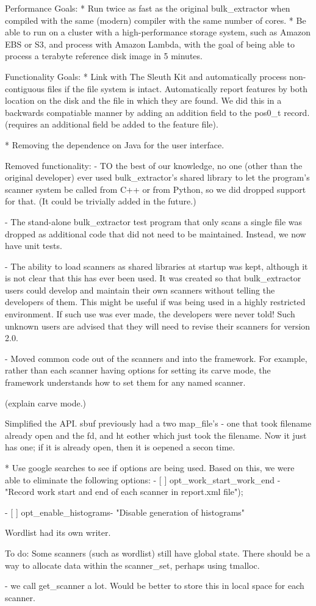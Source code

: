 Performance Goals:
* Run twice as fast as the original bulk_extractor when compiled with
the same (modern) compiler with the same number of cores.
* Be able to run on a cluster with a high-performance storage system,
such as Amazon EBS or S3, and process with Amazon Lambda, with the
goal of being able to process a terabyte reference disk image in 5
minutes.

Functionality Goals:
* Link with The Sleuth Kit and automatically process non-contiguous
files if the file system is intact. Automatically report features by
both location on the disk and the file in which they are found. We did
this in a backwards compatiable manner by adding an addition field to
the pos0_t record.
(requires an additional field be added to the feature file).

* Removing the dependence on Java for the user interface.



Removed functionality:
- TO the best of our knowledge, no one (other than the original
developer) ever used bulk_extractor's shared library to let the
program's scanner system be called from C++ or from Python, so we did
dropped support for that. (It could be trivially added in the future.)

- The stand-alone bulk_extractor test program that only scans a single
file was dropped as additional code that did not need to be
maintained. Instead, we now have unit tests.

- The ability to load scanners as shared libraries at startup was
kept, although it is not clear that this has ever been used. It was
created so that bulk_extractor users could develop and maintain their
own scanners without telling the developers of them. This might be
useful if \be was being used in a highly restricted environment. If
such use was ever made, the developers were never told! Such unknown
users are advised that they will need to revise their scanners for
version 2.0.


- Moved common code out of the scanners and into the framework. For
example, rather than each scanner having options for setting its carve
mode, the framework understands how to set them for any named
scanner.

(explain carve mode.)

Simplified the API. sbuf previously had a two map_file's - one that
took filename already open and the fd, and ht eother which just took
the filename. Now it just has one; if it is already open, then it is
oepened a secon time.


* Use google searches to see if options are being used. Based on this,
we were able to eliminate the following options:
- [ ] opt_work_start_work_end - "Record work start and end of each scanner in report.xml file");

- [ ] opt_enable_histograms- "Disable generation of histograms"

Wordlist had its own writer.


To do:
Some scanners (such as wordlist) still have global state. There should
be a way to allocate data within the scanner_set, perhaps using
tmalloc.

- we call get_scanner a lot. Would be better to store this in local
space for each scanner.
